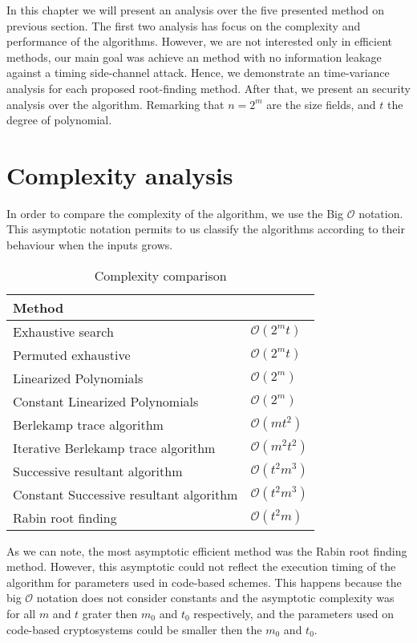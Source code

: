 In this chapter we will present an analysis over the five presented method on previous section. The first two analysis has focus on the complexity and performance of the algorithms. However, we are not interested only in efficient methods, our main goal was achieve an method with no information leakage against a timing side-channel attack. Hence, we demonstrate an time-variance analysis for each proposed root-finding method. After that, we present an security analysis over the algorithm. Remarking that $n = 2^m$ are the size fields, and $t$ the degree of polynomial.

\section{Complexity analysis}
In order to compare the complexity of the algorithm, we use the Big $\mathcal{O}$ notation. This asymptotic notation permits to us classify the algorithms according to their behaviour when the inputs grows. 




\begin{table}[ht]
\centering
\label{tab:complexity}
\caption{Complexity comparison}
\begin{tabular}{ll}
Method                                  &                \\ \hline
Exhaustive search                       & $\mathcal{O}(2^mt)$ \\
Permuted exhaustive                     & $\mathcal{O}(2^mt)$ \\
Linearized Polynomials                  & $\mathcal{O}(2^m)$ \\
Constant Linearized Polynomials         & $\mathcal{O}(2^m)$ \\
Berlekamp trace algorithm               & $\mathcal{O}(mt^2)$ \\
Iterative Berlekamp trace algorithm     & $\mathcal{O}(m^2t^2)$ \\
Successive resultant algorithm          & $\mathcal{O}(t^2m^3)$ \\
Constant Successive resultant algorithm & $\mathcal{O}(t^2m^3)$ \\
Rabin root finding                      & $\mathcal{O}(t^2m)$
\end{tabular}
\end{table}

As we can note, the most asymptotic efficient method was the Rabin root finding method. However, this asymptotic could not reflect the execution timing of the algorithm for parameters used in code-based schemes. This happens because the big $\mathcal{O}$ notation does not consider constants and the asymptotic complexity was for all $m$ and $t$ grater then $m_0$ and $t_0$ respectively, and the parameters used on code-based cryptosystems could be smaller then the $m_0$ and $t_0$.

